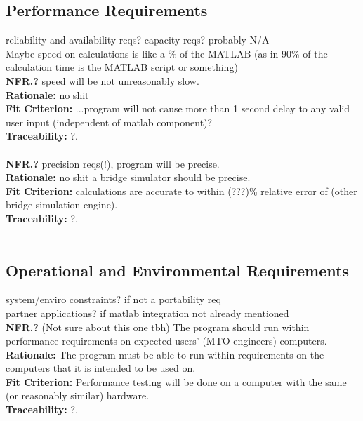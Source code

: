 \documentclass[12pt]{article}
\begin{document}
\subsection{Performance Requirements}

reliability and availability reqs? capacity reqs? probably N/A\\

Maybe speed on calculations is like a \% of the MATLAB (as in 90\% of the calculation time is the MATLAB script or something)\\

  \textbf{NFR.?} speed will be not unreasonably slow.\\
  \textbf{Rationale:} no shit\\
  \textbf{Fit Criterion:} ...program will not cause more than 1 second delay to any valid user input (independent of matlab component)?\\
  \textbf{Traceability:} ?.\\\\

  \textbf{NFR.?} precision reqs(!), program will be precise.\\
  \textbf{Rationale:} no shit a bridge simulator should be precise.\\
  \textbf{Fit Criterion:} calculations are accurate to within (???)\% relative error of (other bridge simulation engine).\\
  \textbf{Traceability:} ?.\\\\

\subsection{Operational and Environmental Requirements}

system/enviro constraints? if not a portability req\\

partner applications? if matlab integration not already mentioned\\

  \textbf{NFR.?} (Not sure about this one tbh) The program should run within performance requirements on expected users' (MTO engineers) computers.\\
  \textbf{Rationale:} The program must be able to run within requirements on the computers that it is intended to be used on.\\
  \textbf{Fit Criterion:} Performance testing will be done on a computer with the same (or reasonably similar) hardware.\\
  \textbf{Traceability:} ?.\\\\
\end{document}
